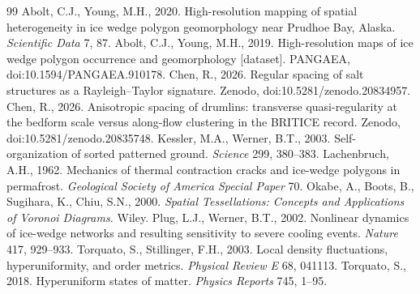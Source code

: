 \documentclass[11pt]{article}
\begin{document}
\begin{thebibliography}{99}
\small
{} Abolt, C.J., Young, M.H., 2020. High-resolution
mapping of spatial heterogeneity in ice wedge polygon geomorphology near Prudhoe Bay, Alaska.
\textit{Scientific Data} 7, 87.
 Abolt, C.J., Young, M.H., 2019. High-resolution
maps of ice wedge polygon occurrence and geomorphology [dataset]. PANGAEA,
doi:10.1594/PANGAEA.910178.
 Chen, R., 2026. Regular spacing of salt structures as a
Rayleigh--Taylor signature. Zenodo, doi:10.5281/zenodo.20834957.
 Chen, R., 2026. Anisotropic spacing of drumlins: transverse
quasi-regularity at the bedform scale versus along-flow clustering in the BRITICE record. Zenodo,
doi:10.5281/zenodo.20835748.
 Kessler, M.A., Werner, B.T., 2003.
Self-organization of sorted patterned ground. \textit{Science} 299, 380--383.
 Lachenbruch, A.H., 1962. Mechanics of thermal
contraction cracks and ice-wedge polygons in permafrost. \textit{Geological Society of America
Special Paper} 70.
 Okabe, A., Boots, B., Sugihara, K., Chiu, S.N., 2000.
\textit{Spatial Tessellations: Concepts and Applications of Voronoi Diagrams.} Wiley.
 Plug, L.J., Werner, B.T., 2002. Nonlinear dynamics
of ice-wedge networks and resulting sensitivity to severe cooling events. \textit{Nature} 417,
929--933.
 Torquato, S., Stillinger, F.H., 2003. Local
density fluctuations, hyperuniformity, and order metrics. \textit{Physical Review E} 68, 041113.
 Torquato, S., 2018. Hyperuniform states of matter.
\textit{Physics Reports} 745, 1--95.
\end{thebibliography}
\end{document}
